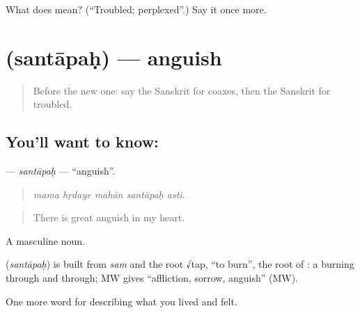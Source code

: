 \begin{tcolorbox}[breakable,colback=teal!4,colframe=teal!35!black,title={Before you move on}]
What does  mean? (\textquotedblleft{}Troubled; perplexed\textquotedblright{}.) Say it once more.
\end{tcolorbox}
\section[\texorpdfstring{\sk{सन्तापः} (santāpaḥ)}{सन्तापः (santāpaḥ)}]{ (santāpaḥ) — anguish}

\label{lesson:SA-C451-santapah}



\begin{quote}
Before the new one: say the Sanskrit for coaxes, then the Sanskrit for troubled.
\end{quote}

\subsection*{You'll want to know: }
\textbf{} — \emph{santāpaḥ} — \textquotedblleft{}anguish\textquotedblright{}.

\begin{quote}
    
\end{quote}

\begin{quote}
\emph{mama hṛdaye mahān santāpaḥ asti.}
\end{quote}

\begin{quote}
There is great anguish in my heart.
\end{quote}

A masculine noun.

\begin{cousinweb}
\textbf{} (\emph{santāpaḥ}) is built from \emph{sam} and the root √tap, \textquotedblleft{}to burn\textquotedblright{}, the root of \textbf{}: a burning through and through; MW gives \textquotedblleft{}affliction, sorrow, anguish\textquotedblright{} (MW).
\end{cousinweb}

\begin{grammarlens}[title={What you've built}]
One more word for describing what you lived and felt.
\end{grammarlens}

